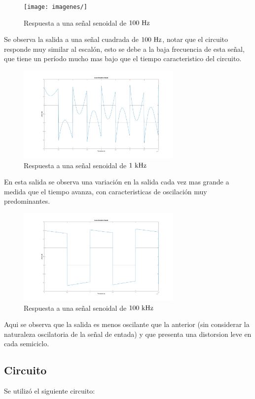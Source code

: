 \begin{figure}[hbt]
	\centering
	\texttt{[image: imagenes/]}	\caption{Respuesta a una señal senoidal de $100\ \si{\hertz}$}	
\end{figure}

Se observa la salida a una señal cuadrada de $100 \ \si{\hertz}$, notar que el circuito responde muy similar al escal\'on, esto se debe a la baja frecuencia de esta señal, que tiene un per\'iodo mucho mas bajo que el tiempo caracteristico del circuito.

\begin{figure}[hbt]
	\centering
	\includegraphics[width=8cm]{imagenes/rtasqar1k}	\caption{Respuesta a una señal senoidal de $1\ \si{\kilo\hertz}$}	
\end{figure}
En esta salida se observa una variaci\'on en la salida cada vez mas grande a medida que el tiempo avanza, con caracteristicas de oscilaci\'on muy predominantes.\\

\pagebreak
\begin{figure}[hbt]
	\centering
	\includegraphics[width=8cm]{imagenes/rtasqar100k}	\caption{Respuesta a una señal senoidal de $100\ \si{\kilo\hertz}$}	
\end{figure}
Aqui se observa que la salida es menos oscilante que la anterior (sin considerar la  naturaleza oscilatoria de la señal de entada)
y que presenta una distorsion leve en cada semiciclo.


\subsection*{Circuito}
Se utiliz\'o el siguiente circuito:


